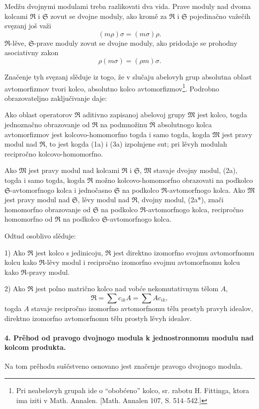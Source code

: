 \documentclass[11pt]{article}
\providecommand{\frM}{\mathfrak M}
\providecommand{\frR}{\mathfrak R}
\providecommand{\frS}{\mathfrak S}
\providecommand{\glqq}{``}
\providecommand{\grqq}{''}
\begin{document}
Medžu dvojnymi modulami treba razlikovati dva vida. Prave moduly nad dvoma kolcami \(\frR\) i \(\frS\) zovut se dvojne moduly, ako kromě za \(\frR\) i \(\frS\) pojedinačno važečih svęzanj još važi
\[
        (m\rho)\sigma=(m\sigma)\rho .
\]
\(\frR\)-lěve, \(\frS\)-prave moduly zovut se dvojne moduly, ako pridodaje se prohodny asociativny zakon
\[
        \rho(m\sigma)=(\rho m)\sigma .
\]

Značenje tyh svęzanj slěduje iz togo, že v slučaju abelovyh grup absolutna oblast avtomorfizmov tvori kolco, absolutno kolco avtomorfizmov\footnote{Pri neabelovyh grupah ide o \glqq{}obobćeno\grqq{} kolco, sr. rabotu H. Fittinga, ktora ima iziti v Math. Annalen. [Math. Annalen 107, S. 514--542.]}. Podrobno obrazovateljno zaključivanje daje:

Ako oblast operatorov \(\frR\) aditivno zapisanoj abelovoj grupy \(\frM\) jest kolco, togda jednoznačno obrazovanje od \(\frR\) na podmnožinu \(\overline{\frR}\) absolutnogo kolca avtomorfizmov jest kolcovo-homomorfno togda i samo togda, kogda \(\frM\) jest pravy modul nad \(\frR\), to jest kogda (1a) i (3a) izpolnjene sut; pri lěvyh modulah recipročno kolcovo-homomorfno.

Ako \(\frM\) jest pravy modul nad kolcami \(\frR\) i \(\frS\), \(\frM\) stavaje dvojny modul, (2a), togda i samo togda, kogda \(\frR\) možno kolcovo-homomorfno obrazovati na podkolco \(\frS\)-avtomorfnogo kolca i jednočasno \(\frS\) na podkolco \(\frR\)-avtomorfnogo kolca. Ako \(\frM\) jest pravy modul nad \(\frS\), lěvy modul nad \(\frR\), dvojny modul, (2a*), znači homomorfno obrazovanje od \(\frS\) na podkolco \(\frR\)-avtomorfnogo kolca, recipročno homomorfno od \(\frR\) na podkolco \(\frS\)-avtomorfnogo kolca.

Odtud osoblivo slěduje:

1) Ako \(\frR\) jest kolco s jedinicoju, \(\frR\) jest direktno izomorfno svojmu avtomorfnomu kolcu kako \(\frR\)-lěvy modul i recipročno izomorfno svojmu avtomorfnomu kolcu kako \(\frR\)-pravy modul.

2) Ako \(\frR\) jest polno matrično kolco nad vobće nekomutativnym tělom \(A\),
\[
        \frR=\sum c_{ik}A=\sum A c_{ik},
\]
togda \(A\) stavaje recipročno izomorfno avtomorfnomu tělu prostyh pravyh idealov, direktno izomorfno avtomorfnomu tělu prostyh lěvyh idealov.

\paragraph{4. Prěhod od pravogo dvojnogo modula k jednostronnomu modulu nad kolcom produkta.}
Na tom prěhodu suščstveno osnovano jest značenje pravogo dvojnogo modula.
\end{document}
